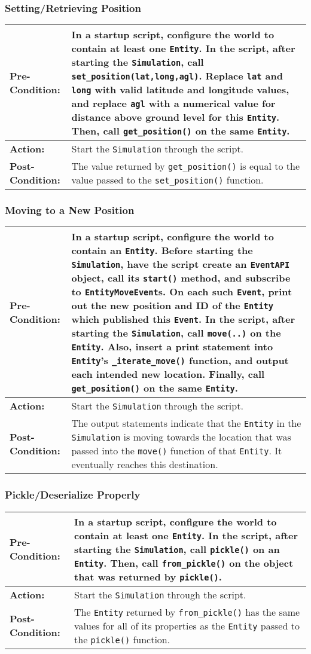 \documentclass[titlepage]{article}
\newcommand{\testcase}[3]{
    \begin{center}
    \begin{tabular}{| l | p{0.7\textwidth}|}
        \hline
        \rowcolor[gray]{0.8}\textbf{Pre-Condition:} & #1 \\ \hline
        \textbf{Action:} & #2 \\ \hline
        \rowcolor[gray]{0.8}\textbf{Post-Condition:} & #3 \\ \hline
    \end{tabular}
    \end{center}
}
\begin{document}
\subsubsection{Setting/Retrieving Position}
\testcase{In a startup script, configure the world to contain at least one \texttt{Entity}. In the script, after starting the \texttt{Simulation}, call \texttt{set\_position(lat,long,agl)}. Replace \texttt{lat} and \texttt{long} with valid latitude and longitude values, and replace \texttt{agl} with a numerical value for distance above ground level for this \texttt{Entity}. Then, call \texttt{get\_position()} on the same \texttt{Entity}.}{Start the \texttt{Simulation} through the script.}{The value returned by \texttt{get\_position()} is equal to the value passed to the \texttt{set\_position()} function.}

\subsubsection{Moving to a New Position}
\testcase{In a startup script, configure the world to contain an \texttt{Entity}. Before starting the \texttt{Simulation}, have the script create an \texttt{EventAPI} object, call its \texttt{start()} method, and subscribe to \texttt{EntityMoveEvent}s. On each such \texttt{Event}, print out the new position and ID of the \texttt{Entity} which published this \texttt{Event}. In the script, after starting the \texttt{Simulation}, call \texttt{move(..)} on the \texttt{Entity}. Also, insert a print statement into \texttt{Entity}'s \texttt{\_iterate\_move()} function, and output each intended new location. Finally, call \texttt{get\_position()} on the same \texttt{Entity}.}{Start the \texttt{Simulation} through the script.}{The output statements indicate that the \texttt{Entity} in the \texttt{Simulation} is moving towards the location that was passed into the \texttt{move()} function of that \texttt{Entity}. It eventually reaches this destination.}

\subsubsection{Pickle/Deserialize Properly}
\testcase{In a startup script, configure the world to contain at least one \texttt{Entity}. In the script, after starting the \texttt{Simulation}, call \texttt{pickle()} on an \texttt{Entity}. Then, call \texttt{from\_pickle()} on the object that was returned by \texttt{pickle()}.}{Start the \texttt{Simulation} through the script.}{The \texttt{Entity} returned by \texttt{from\_pickle()} has the same values for all of its properties as the \texttt{Entity} passed to the \texttt{pickle()} function.}
\end{document}
